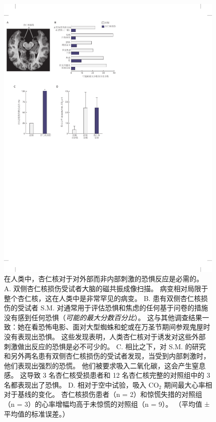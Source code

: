 \begin{figure}[htbp]
	\centering
	\includegraphics[width=1.0\linewidth]{chap42/fig_42_6}
	\caption{在人类中，杏仁核对于对外部而非内部刺激的恐惧反应是必需的。
		A. 双侧杏仁核损伤受试者大脑的磁共振成像扫描。
		病变相对局限于整个杏仁核，这在人类中是非常罕见的病变。
		B. 患有双侧杏仁核损伤的受试者 S.M. 对通常用于评估恐惧和焦虑的任何基于问卷的措施没有感到任何恐惧（\textit{可能的最大分数百分比}）。
		这与其他调查结果一致：她在看恐怖电影、面对大型蜘蛛和蛇或在万圣节期间参观鬼屋时没有表现出恐惧。
		这些发现表明，人类杏仁核对于诱发对这些外部刺激做出反应的恐惧是必不可少的。
		C. 相比之下，对 S.M. 的研究和另外两名患有双侧杏仁核损伤的受试者发现，当受到内部刺激时，他们表现出强烈的恐慌。
		他们被要求吸入二氧化碳，这会产生窒息感。
		这导致 3 名杏仁核受损患者和 12 名杏仁核完整的对照组中的 3 名都表现出了恐惧。
		D. 相对于空中试验，吸入 CO$_2$ 期间最大心率相对于基线的变化。
		杏仁核损伤患者（n = 2）和惊慌失措的对照组（n = 3）的心率增幅均高于未惊慌的对照组（n = 9）。
		（平均值 ± 平均值的标准误差。）\cite{feinstein2011human} }
	\label{fig:42_6}
\end{figure}


